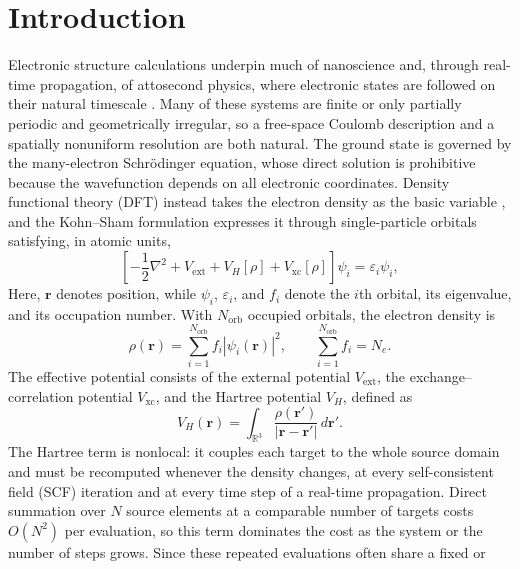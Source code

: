 \documentclass[a4paper,pdflatex,sn-mathphys-num]{sn-jnl}
\theoremstyle{thmstyleone}
\begin{document}
\section{Introduction}
Electronic structure calculations underpin much of nanoscience
\cite{Ogut2003} and, through real-time propagation, of attosecond physics,
where electronic states are followed on their natural timescale
\cite{LopataGovind2011}. Many of these systems are finite or only partially
periodic and geometrically irregular, so a free-space Coulomb description and a
spatially nonuniform resolution are both natural.
The ground state is governed by the many-electron Schr\"odinger equation, whose
direct solution is prohibitive because the wavefunction depends on all electronic
coordinates. Density functional theory (DFT) instead takes the electron density
as the basic variable \cite{Hohenberg1964,Parr1989,Martin2004,Jones2015}, and the
Kohn--Sham formulation \cite{Kohn1965} expresses it through single-particle
orbitals satisfying, in atomic units,
\begin{equation}
\label{eq:kohn_sham}
\left[
-\frac{1}{2}\nabla^2
+V_{\mathrm{ext}}
+V_H[\rho]
+V_{\mathrm{xc}}[\rho]
\right]\psi_i
=\varepsilon_i\psi_i,
\end{equation}
Here, \(\mathbf r\) denotes position, while \(\psi_i\), \(\varepsilon_i\), and \(f_i\) denote the \(i\)th orbital, its eigenvalue, and its occupation number. With \(N_{\mathrm{orb}}\) occupied orbitals, the electron density is
\begin{equation}
\label{eq:electron_density}
\rho(\mathbf r)=\sum_{i=1}^{N_{\mathrm{orb}}}f_i|\psi_i(\mathbf r)|^2,
\qquad \sum_{i=1}^{N_{\mathrm{orb}}}f_i=N_e.
\end{equation}
The effective potential consists of the external potential \(V_{\mathrm{ext}}\), the exchange–correlation potential \(V_{\mathrm{xc}}\), and the Hartree potential \(V_H\), defined as
\begin{equation}
\label{eq:hartree}
V_H(\mathbf r)
=\int_{\mathbb R^3}
\frac{\rho(\mathbf r')}{|\mathbf r-\mathbf r'|}
\,d\mathbf r'.
\end{equation}
The Hartree term is nonlocal: it couples each target to the whole source domain
and must be recomputed whenever the density changes, at every self-consistent
field (SCF) iteration and at every time step of a real-time propagation. Direct
summation over $N$ source elements at a comparable number of targets costs
$O(N^2)$ per evaluation, so this term dominates the cost as the system or the
number of steps grows. Since these repeated evaluations often share a fixed or
\end{document}
